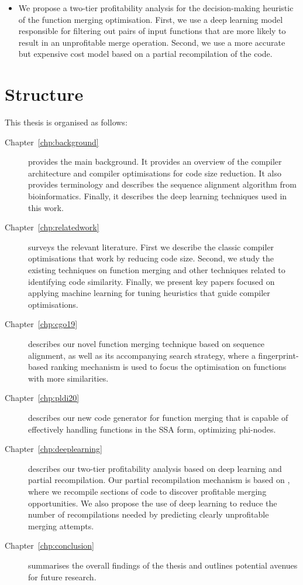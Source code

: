 \begin{itemize}
  \item
  We propose a two-tier profitability analysis for the decision-making heuristic of the function merging optimisation.
  First, we use a deep learning model responsible for filtering out pairs of input functions that are more likely to result in an unprofitable merge operation.
  Second, we use a more accurate but expensive cost model based on a partial recompilation of the code.
\end{itemize}

\section{Structure}

This thesis is organised as follows:
\begin{description}

\item[Chapter~\ref{chp:background}] provides the main background. It provides an overview of the compiler architecture and compiler optimisations for code size reduction.
It also provides terminology and describes the sequence alignment algorithm from bioinformatics.
Finally, it describes the deep learning techniques used in this work.

\item[Chapter~\ref{chp:relatedwork}] surveys the relevant literature. First we describe the classic compiler optimisations that work by reducing code size. Second, we study the existing techniques on function merging and other techniques related to identifying code similarity. Finally, we present key papers focused on applying machine learning for tuning heuristics that guide compiler optimisations.

\item[Chapter~\ref{chp:cgo19}] describes our novel function merging technique based on sequence alignment, as well as its accompanying search strategy, where a fingerprint-based ranking mechanism is used to focus the optimisation on functions with more similarities. %

\item[Chapter~\ref{chp:pldi20}] describes our new code generator for function merging that is capable of effectively handling functions in the SSA form, optimizing phi-nodes.

\item[Chapter~\ref{chp:deeplearning}] describes our two-tier profitability analysis based on deep learning and partial recompilation. Our partial recompilation mechanism is based on {\itercomp}, where we recompile sections of code to discover profitable merging opportunities. We also propose the use of deep learning to reduce the number of recompilations needed by predicting clearly unprofitable merging attempts.

\item[Chapter~\ref{chp:conclusion}] summarises the overall findings of the thesis and outlines potential avenues for future research.

\end{description}
